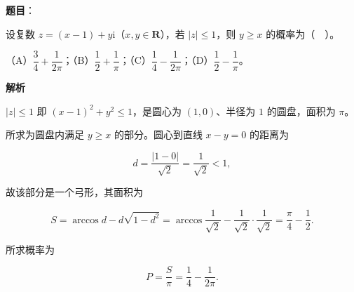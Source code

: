 \begin{answer}

\textbf{题目}：

设复数 $z=(x-1)+y\mathrm{i}$（$x,y\in\mathbf{R}$），若 $|z|\le 1$，则 $y\ge x$ 的概率为（　）。

（A）$\dfrac{3}{4}+\dfrac{1}{2\pi}$；（B）$\dfrac{1}{2}+\dfrac{1}{\pi}$；（C）$\dfrac{1}{4}-\dfrac{1}{2\pi}$；（D）$\dfrac{1}{2}-\dfrac{1}{\pi}$。

\textbf{解析}

$|z|\le 1$ 即 $(x-1)^{2}+y^{2}\le 1$，是圆心为 $(1,0)$、半径为 $1$ 的圆盘，面积为 $\pi$。

所求为圆盘内满足 $y\ge x$ 的部分。圆心到直线 $x-y=0$ 的距离为

\nopagebreak[4]
\[
d=\frac{|1-0|}{\sqrt{2}}=\frac{1}{\sqrt{2}}<1,
\]

故该部分是一个弓形，其面积为

\nopagebreak[4]
\[
S=\arccos d-d\sqrt{1-d^{2}}=\arccos\frac{1}{\sqrt{2}}-\frac{1}{\sqrt{2}}\cdot\frac{1}{\sqrt{2}}=\frac{\pi}{4}-\frac{1}{2}.
\]

所求概率为

\nopagebreak[4]
\[
P=\frac{S}{\pi}=\frac{1}{4}-\frac{1}{2\pi}.
\]


\end{answer}

